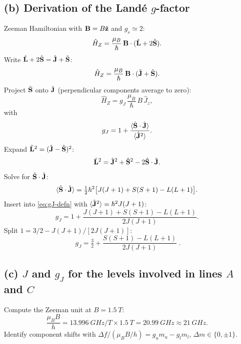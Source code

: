 \documentclass[11pt]{article}
\begin{document}
\subsection*{(b) Derivation of the Land\'e $g$-factor}

Zeeman Hamiltonian with $\vb B=B\hat{\vb z}$ and $g_{s}\simeq 2$:
\begin{equation}
\hat H_{Z}=\frac{\mu_{B}}{\hbar}\,\vb B\cdot(\hat{\vb L}+2\hat{\vb S}).
\label{eq:HZ}
\end{equation}
Write $\hat{\vb L}+2\hat{\vb S}=\hat{\vb J}+\hat{\vb S}$:
\begin{equation}
\hat H_{Z}=\frac{\mu_{B}}{\hbar}\,\vb B\cdot(\hat{\vb J}+\hat{\vb S}).
\end{equation}
Project $\hat{\vb S}$ onto $\hat{\vb J}$ (perpendicular components average to zero):
\begin{equation}
\hat H_{Z}=g_{J}\,\frac{\mu_{B}}{\hbar}\,B\,\hat J_{z},
\end{equation}
with
\begin{equation}
g_{J}=1+\frac{\langle\hat{\vb S}\cdot\hat{\vb J}\rangle}{\langle\hat{\vb J}^{2}\rangle}.
\label{eq:gJ-defn}
\end{equation}
Expand $\hat{\vb L}^{2}=(\hat{\vb J}-\hat{\vb S})^{2}$:
\begin{equation}
\hat{\vb L}^{2}=\hat{\vb J}^{2}+\hat{\vb S}^{2}-2\hat{\vb S}\cdot\hat{\vb J}.
\end{equation}
Solve for $\hat{\vb S}\cdot\hat{\vb J}$:
\begin{equation}
\langle\hat{\vb S}\cdot\hat{\vb J}\rangle=\tfrac{1}{2}\hbar^{2}\bigl[J(J+1)+S(S+1)-L(L+1)\bigr].
\label{eq:SdotJ}
\end{equation}
Insert into \eqref{eq:gJ-defn} with $\langle\hat{\vb J}^{2}\rangle=\hbar^{2}J(J+1)$:
\begin{equation}
g_{J}=1+\frac{J(J+1)+S(S+1)-L(L+1)}{2J(J+1)}.
\end{equation}
Split $1=3/2-J(J+1)/[2J(J+1)]$:
\begin{equation}
\boxed{\;g_{J}=\tfrac{3}{2}+\frac{S(S+1)-L(L+1)}{2J(J+1)}\;}.
\label{eq:gJ-final}
\end{equation}

\subsection*{(c) $J$ and $g_{J}$ for the levels involved in lines $A$ and $C$}

Compute the Zeeman unit at $B=\SI{1.5}{T}$:
\begin{equation}
\frac{\mu_{B}B}{h}=\SI{13.996}{GHz/T}\times\SI{1.5}{T}=\SI{20.99}{GHz}\approx \SI{21}{GHz}.
\label{eq:muBoverh}
\end{equation}
Identify component shifts with $\Delta f/(\mu_{B}B/h)=g_{u}m_{u}-g_{l}m_{l}$, $\Delta m\in\{0,\pm 1\}$.
\end{document}
